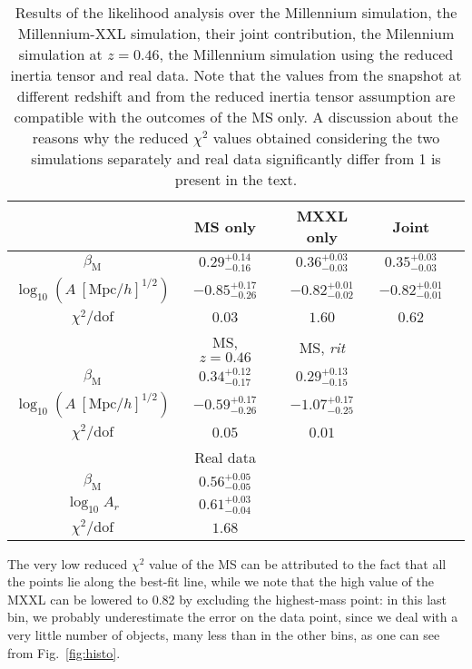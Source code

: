 \documentclass[a4paper,11pt]{article}
\begin{document}
\begin{table*}
	\centering
	\caption{Results of the likelihood analysis over the Millennium simulation, the Millennium-XXL simulation, their joint contribution, the Milennium simulation at $z = 0.46$, the Millennium simulation using the reduced inertia tensor and real data. Note that the values from the snapshot at different redshift and from the reduced inertia tensor assumption are compatible with the outcomes of the MS only. A discussion about the reasons why the reduced $\chi^2$ values obtained considering the two simulations separately and real data significantly differ from 1 is present in the text.}
	\label{tab:param}
	\begin{tabular}{c||cccc} %
		\hline \hline
		\ & MS only & MXXL only & Joint \\ 
		\hline
		$\beta_{\mathrm{M}}$					  & $0.29^{+0.14}_{-0.16}$   & $0.36^{+0.03}_{-0.03}$  & $0.35^{+0.03}_{-0.03}$ \\
		$\log_{10} (A \ [\mbox{Mpc}/h]^{1/2})$ & $-0.85^{+0.17}_{-0.26}$ & $-0.82^{+0.01}_{-0.02}$ & $-0.82^{+0.01}_{-0.01}$ \\
		$\chi^2 / \mbox{dof}$			  & $0.03$                                 & $1.60$			 & $0.62$			 \\
		\hline \hline
		\ & MS, $z=0.46$ & MS, \textit{rit} & \ \\
		\hline
		$\beta_{\mathrm{M}}$					  &  $0.34^{+0.12}_{-0.17}$ & $0.29^{+0.13}_{-0.15}$ & \\
		$\log_{10} (A \ [\mbox{Mpc}/h]^{1/2})$ & $-0.59^{+0.17}_{-0.26}$ &  $-1.07^{+0.17}_{-0.25}$ & \\
		$\chi^2 / \mbox{dof}$			      & $0.05$			      & $0.01$	& \\
		\hline \hline
		\ & Real data & \ & \ \\
		\hline
		$\beta_{\mathrm{M}}$ & $0.56^{+0.05}_{-0.05}$ & & \\
		$\log_{10} A_r $ & $0.61^{+0.03}_{-0.04}$ & &  \\
		$\chi^2 / \mbox{dof}$			  & $1.68$  & &  \\
		\hline \hline 
		\end{tabular}
\end{table*}

The very low reduced $\chi^2$ value of the MS can be attributed to the fact that all the points lie along the best-fit line, while we note that the high value of the MXXL can be lowered to 0.82 by excluding the highest-mass point: in this last bin, we probably underestimate the error on the data point, since we deal with a very little number of objects, many less than in the other bins, as one can see from Fig.~\ref{fig:histo}.
\end{document}
